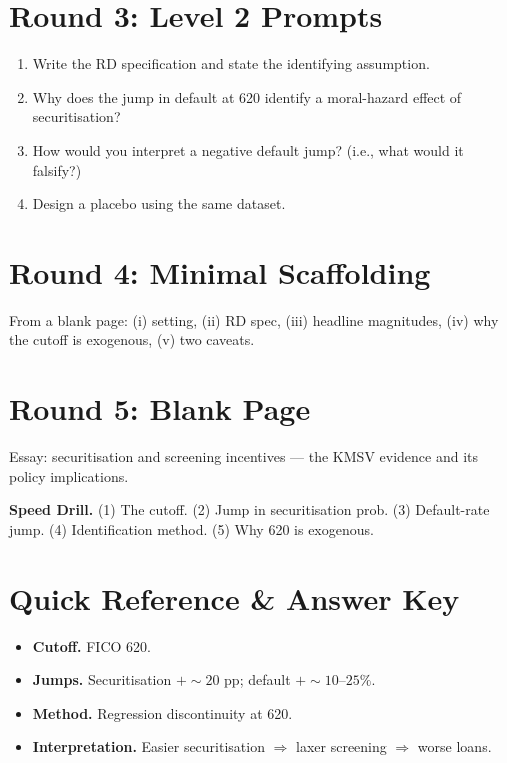 \documentclass[11pt]{article}
\begin{document}
\section*{Round 3: Level 2 Prompts}
\begin{enumerate}
\item Write the RD specification and state the identifying assumption.
\item Why does the jump in default at 620 identify a moral-hazard effect of securitisation?
\item How would you interpret a negative default jump? (i.e., what would it falsify?)
\item Design a placebo using the same dataset.
\end{enumerate}

\section*{Round 4: Minimal Scaffolding}
From a blank page: (i) setting, (ii) RD spec, (iii) headline magnitudes, (iv) why the cutoff is exogenous, (v) two caveats.

\section*{Round 5: Blank Page}
Essay: securitisation and screening incentives --- the KMSV evidence and its policy implications.

\vspace{6pt}
\begin{drillbox}
\textbf{Speed Drill.} (1) The cutoff. (2) Jump in securitisation prob. (3) Default-rate jump. (4) Identification method. (5) Why 620 is exogenous.
\end{drillbox}

\section*{Quick Reference \& Answer Key}
\begin{answerbox}
\begin{itemize}
\item \textbf{Cutoff.} FICO 620.
\item \textbf{Jumps.} Securitisation $+\sim 20$ pp; default $+\sim 10$--$25\%$.
\item \textbf{Method.} Regression discontinuity at 620.
\item \textbf{Interpretation.} Easier securitisation $\Rightarrow$ laxer screening $\Rightarrow$ worse loans.
\end{itemize}
\end{answerbox}
\end{document}
